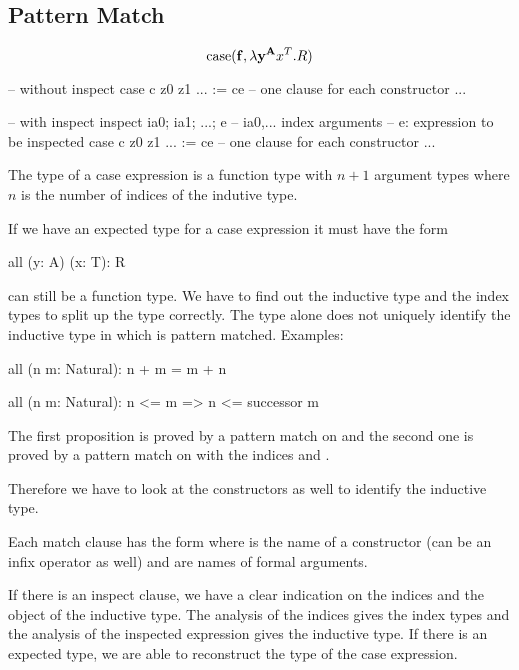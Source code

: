 \vskip 5mm
\subsection{Pattern Match}

$$
    \text{case} (\mathbf{f}, \lambda \mathbf{y}^{\mathbf{A}} x^T . R)
$$


\begin{alba}
    -- without inspect
    case
        c z0 z1 ... := ce       -- one clause for each constructor
        ...

    -- with inspect
    inspect
        ia0; ia1; ...; e    -- ia0,... index arguments
                            -- e: expression to be inspected
    case
        c z0 z1 ... := ce       -- one clause for each constructor
        ...
\end{alba}

The type of a case expression is a function type with $n + 1$ argument types
where $n$ is the number of indices of the indutive type.

If we have an expected type for a case expression it must have the form
\begin{alba}
    all (y: A) (x: T): R
\end{alba}

 can still be a function type. We have to find out the inductive type
and the index types to split up the type correctly. The type alone does not
uniquely identify the inductive type in which is pattern matched. Examples:

\begin{alba}
    all (n m: Natural): n + m = m + n

    all (n m: Natural): n <= m => n <= successor m
\end{alba}

The first proposition is proved by a pattern match on  and the second
one is proved by a pattern match on  with the indices  and
.

Therefore we have to look at the constructors as well to identify the inductive
type.

Each match clause has the form  where  is the name of
a constructor (can be an infix operator as well) and  are
names of formal arguments.

If there is an inspect clause, we have a clear indication on the indices and the
object of the inductive type. The analysis of the indices gives the index types
and the analysis of the inspected expression gives the inductive type. If there
is an expected type, we are able to reconstruct the type of the case expression.

